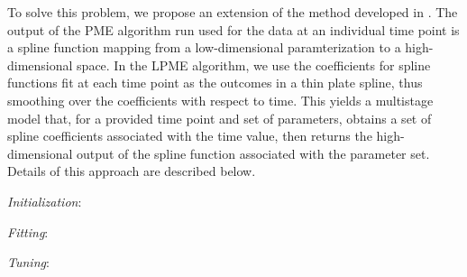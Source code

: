 \documentclass[11pt,reqno]{article}
\theoremstyle{definition}
\begin{document}
To solve this problem, we propose an extension of the method developed in \cite{mengPrincipalManifoldEstimation2021}. The output of the PME algorithm run used for the data at an individual time point is a spline function mapping from a low-dimensional paramterization to a high-dimensional space. In the LPME algorithm, we use the coefficients for spline functions fit at each time point as the outcomes in a thin plate spline, thus smoothing over the coefficients with respect to time. This yields a multistage model that, for a provided time point and set of parameters, obtains a set of spline coefficients associated with the time value, then returns the high-dimensional output of the spline function associated with the parameter set. Details of this approach are described below.

\textit{Initialization}: 

\textit{Fitting}:

\textit{Tuning}:

\LinesNumbered


\LinesNumbered
\end{document}
